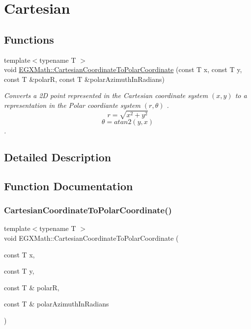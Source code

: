 \hypertarget{group___e_g_x_math-_conversions-_coordinate_conversions-2_d-_cartesian}{}\section{Cartesian}
\label{group___e_g_x_math-_conversions-_coordinate_conversions-2_d-_cartesian}
\subsection*{Functions}
\begin{DoxyCompactItemize}
\item 
{\footnotesize template$<$typename T $>$ }\\void \mbox{\hyperlink{group___e_g_x_math-_conversions-_coordinate_conversions-2_d-_cartesian_ga01ead70b7b75d7ad0f80776c8c254897}{E\+G\+X\+Math\+::\+Cartesian\+Coordinate\+To\+Polar\+Coordinate}} (const T x, const T y, const T \&polarR, const T \&polar\+Azimuth\+In\+Radians)
\begin{DoxyCompactList}\small\item\em Converts a 2D point represented in the Cartesian coordinate system $(x,y)$ to a representation in the Polar coordiante system $(r,\theta)$ . \[ r = \sqrt{x^2+y^2} \] \[ \theta = atan2(y,x) \]. \end{DoxyCompactList}\end{DoxyCompactItemize}


\subsection{Detailed Description}


\subsection{Function Documentation}
\mbox{\label{group___e_g_x_math-_conversions-_coordinate_conversions-2_d-_cartesian_ga01ead70b7b75d7ad0f80776c8c254897}} 
\subsubsection{\texorpdfstring{Cartesian\+Coordinate\+To\+Polar\+Coordinate()}{CartesianCoordinateToPolarCoordinate()}}
{\footnotesize\ttfamily template$<$typename T $>$ \\
void E\+G\+X\+Math\+::\+Cartesian\+Coordinate\+To\+Polar\+Coordinate (\begin{DoxyParamCaption}\item[{const T}]{x,  }\item[{const T}]{y,  }\item[{const T \&}]{polarR,  }\item[{const T \&}]{polar\+Azimuth\+In\+Radians }\end{DoxyParamCaption})}



